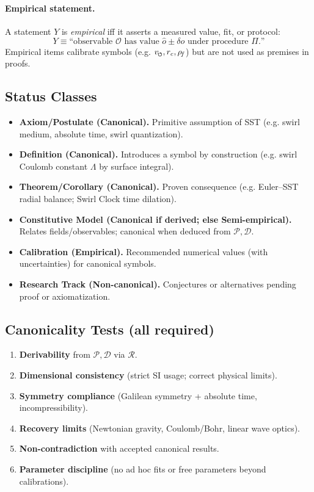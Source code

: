 \documentclass[11pt]{article}
\newcommand{\swirlarrow}{%
     \mathchoice{\mkern-2mu\scriptstyle\boldsymbol{\circlearrowleft}}%
                {\mkern-2mu\scriptstyle\boldsymbol{\circlearrowleft}}%
                {\mkern-2mu\scriptscriptstyle\boldsymbol{\circlearrowleft}}%
                {\mkern-2mu\scriptscriptstyle\boldsymbol{\circlearrowleft}}%
}
\newcommand{\vscore}{v_{\swirlarrow}}                    %
\newcommand{\rhof}{\rho_{\!f}}                           %
\newcommand{\rc}{r_c}                                    %
\begin{document}
\paragraph{Empirical statement.}
    A statement $Y$ is \emph{empirical} iff it asserts a measured value, fit, or protocol:
    \[
        Y \equiv \text{“observable $\mathcal{O}$ has value $\hat{o}\pm \delta o$ under procedure $\Pi$.”}
    \]
    Empirical items calibrate symbols (e.g. $\vscore, \rc, \rhof$) but are not used as premises in proofs.

\subsection*{Status Classes}
\begin{itemize}
    \item \textbf{Axiom/Postulate (Canonical).} Primitive assumption of SST (e.g. swirl medium, absolute time, swirl quantization).
    \item \textbf{Definition (Canonical).} Introduces a symbol by construction (e.g. swirl Coulomb constant $\Lambda$ by surface integral).
    \item \textbf{Theorem/Corollary (Canonical).} Proven consequence (e.g. Euler–SST radial balance; Swirl Clock time dilation).
    \item \textbf{Constitutive Model (Canonical if derived; else Semi-empirical).} Relates fields/observables; canonical when deduced from $\mathcal{P},\mathcal{D}$.
    \item \textbf{Calibration (Empirical).} Recommended numerical values (with uncertainties) for canonical symbols.
    \item \textbf{Research Track (Non-canonical).} Conjectures or alternatives pending proof or axiomatization.
\end{itemize}

\subsection*{Canonicality Tests (all required)}
\begin{enumerate}
    \item \textbf{Derivability} from $\mathcal{P},\mathcal{D}$ via $\mathcal{R}$.
    \item \textbf{Dimensional consistency} (strict SI usage; correct physical limits).
    \item \textbf{Symmetry compliance} (Galilean symmetry + absolute time, incompressibility).
    \item \textbf{Recovery limits} (Newtonian gravity, Coulomb/Bohr, linear wave optics).
    \item \textbf{Non-contradiction} with accepted canonical results.
    \item \textbf{Parameter discipline} (no ad hoc fits or free parameters beyond calibrations).
\end{enumerate}
\end{document}
